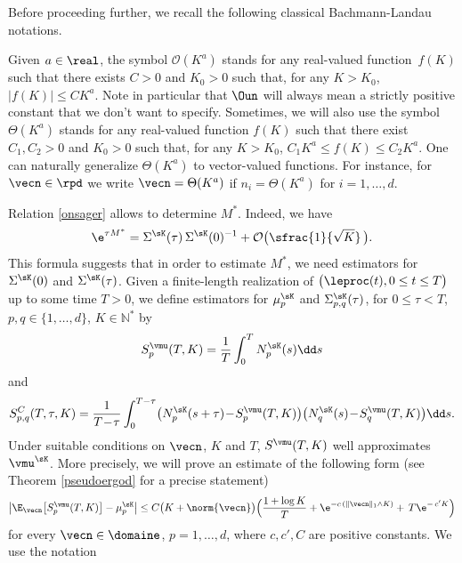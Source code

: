 Before proceeding further, we recall the following classical Bachmann-Landau notations.
\begin{notations}
Given $a\in\real$, the symbol $\mathcal{O}(K^a)$ stands for any real-valued function~$f(K)$ such that
there exists $C>0$ and $K_0>0$ such that, for any $K>K_0$, $|f(K)|\leq C K^a$. Note in particular that $\Oun$ will always mean a strictly positive constant that we don't want to specify.
Sometimes, we will also use the symbol $\Theta(K^a)$ stands for any real-valued function $f(K)$ such that there exist $C_1,C_2>0$ and $K_0>0$
such that, for any $K>K_0$, $C_1 K^a\leq f(K)\leq C_2 K^a$. One can naturally generalize $\Theta(K^a)$ to vector-valued functions. For instance, for $
\vecn\in\rpd$ we write $\vecn=\Theta(K^a)$ if $n_i=\Theta(K^a)$ for $i=1,\ldots,d$.
\end{notations}
Relation \eqref{onsager} allows to determine $M^*$. Indeed, we have
\begin{equation}\label{matrix-onsager}
\e^{\tau M^*} = \Sigma^{\sK}(\tau)\,\Sigma^{\sK}(0)^{-1} + \mathcal{O}\bigl(\sfrac{1}{\sqrt{K}}\,\bigr).
\end{equation}
This formula suggests that in order to estimate $M^*$, we need estimators for $\Sigma^{\sK}(0)$ and $\Sigma^{\sK}(\tau)$.
Given a finite-length realization of $\bigl(\leproc(t), 0\le t\le T\bigr)$ up to some time $T>0$, we define estimators for
$\mu_{p}^{\sK}$ and $\Sigma^{\sK}_{p,q}(\tau)$,
for $0\le \tau<T$, $p,q\in\{1,\ldots, d\}$, $K\in \mathbb{N}^*$ by
\begin{equation}
\label{stat-mu}
S^{\vmu}_{p}(T,K) =\frac{1}{T}\int_{0}^{T}N_{p}^{\sK}(s) \dd s
\end{equation}
and
\begin{equation}\label{stat-sigma}
S^{C}_{p,q}(T,\tau,K) =\frac{1}{T\!-\!\tau}\int_{0}^{T-\tau}\bigl(N_{p}^{\sK}(s+\tau)\!-\!S^{\vmu}_{p}(T,K)\bigr)
\bigl(N_{q}^{\sK}(s)\!-\!S^{\vmu}_{q}(T,K)\bigr)\dd s.
\end{equation}
Under suitable conditions on $\vecn$, $K$ and $T$, $S^{\vmu}(T,K)$ well approximates $\vmu^{\sK}$.
More precisely, we will prove an estimate of the following form (see Theorem \ref{pseudoergod} for a precise statement)
\begin{equation}\label{control-est-mu}
\left|\E_{\vecn}\bigl[S^{\vmu}_{p}(T,K)\bigr]-\mu_p^{\sK}\right| \leq C\bigl(K+\norm{\vecn}\bigr)\Bigl(\frac{1+\log K}{T} + \e^{-c\,(\|\vecn\|_{1}\wedge K)}+\, T\e^{-\,c' K} \Bigr)
\end{equation}
for every $\vecn\in\domaine$, $p=1,\ldots,d$, where $c,c',C$ are positive constants. We use the notation
